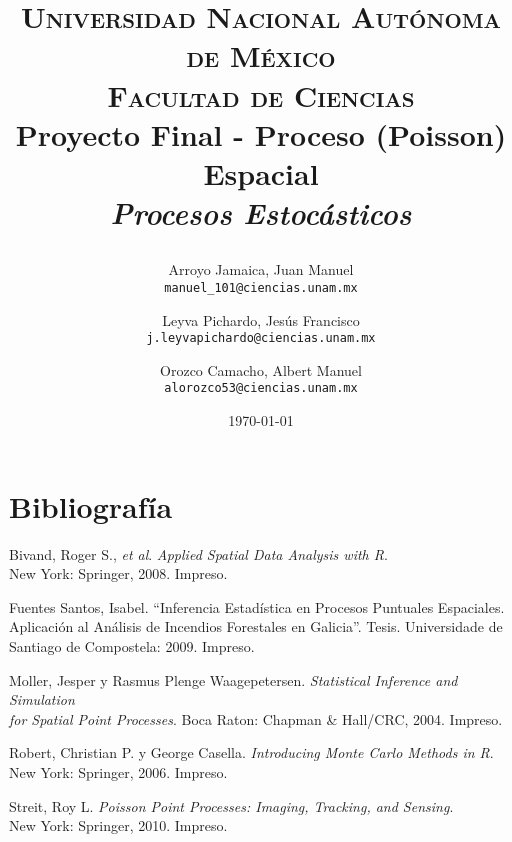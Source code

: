 \documentclass[paper=letter, fontsize=12pt]{scrartcl} %
\title{
  \vspace*{-2cm}
  \begin{center}
    \normalfont \normalsize
    \textsc{Universidad Nacional Autónoma de México\\Facultad de Ciencias} \\ [5pt]
    \Large \textbf{Proyecto Final - Proceso (Poisson) Espacial} \\ [5pt] %
    \large \textit{Procesos Estocásticos} \\
  \end{center}
}
\author{
  \small Arroyo Jamaica, Juan Manuel\\ [-10pt]
  \small \texttt{manuel\_101@ciencias.unam.mx}
  \and
  \small Leyva Pichardo, Jesús Francisco\\ [-10pt]
  \small \texttt{j.leyvapichardo@ciencias.unam.mx}
  \and
  \small Orozco Camacho, Albert Manuel\\ [-10pt]
  \small \texttt{alorozco53@ciencias.unam.mx}
  \vspace*{5pt}
} %
\date{\normalsize\today} %
\numberwithin{equation}{section} %
\numberwithin{figure}{section} %
\numberwithin{table}{section} %
\begin{document}
\maketitle

\section*{\centering Bibliografía}
\vspace*{1.1cm}
%
Bivand, Roger S., \textit{et al}. \textit{Applied Spatial Data Analysis with R}.\\
New York: Springer, 2008. Impreso.\par
\vspace*{1.1cm}
%
Fuentes Santos, Isabel. ``Inferencia Estadística en Procesos Puntuales Espaciales.\\
Aplicación al Análisis de Incendios Forestales en Galicia''. Tesis. Universidade de\\
Santiago de Compostela: 2009. Impreso.\par
\vspace*{1.1cm}
%
Moller, Jesper y Rasmus Plenge Waagepetersen. \textit{Statistical Inference and Simulation\\
  for Spatial Point Processes}. Boca Raton: Chapman \& Hall/CRC, 2004. Impreso.\par
\vspace*{1.1cm}
%
Robert, Christian P. y George Casella. \textit{Introducing Monte Carlo Methods in R}.\\
New York: Springer, 2006. Impreso.\par
\vspace*{1.1cm}
%
Streit, Roy L. \textit{Poisson Point Processes: Imaging, Tracking, and Sensing}.\\
New York: Springer, 2010. Impreso.
\end{document}
